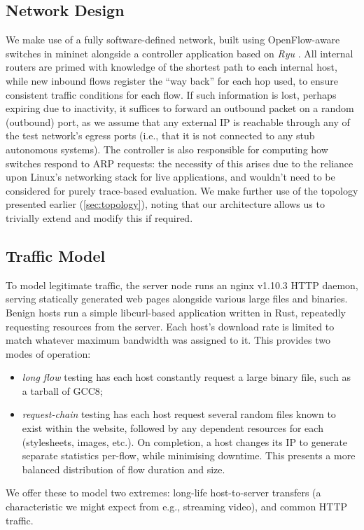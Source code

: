 \documentclass[conference, a4paper, 10pt, times]{IEEEtran}
\begin{document}
\subsection{Network Design}
We make use of a fully software-defined network, built using OpenFlow-aware switches in mininet alongside a controller application based on \emph{Ryu} \cite{ryu}.
All internal routers are primed with knowledge of the shortest path to each internal host, while new inbound flows register the ``way back'' for each hop used, to ensure consistent traffic conditions for each flow.
If such information is lost, perhaps expiring due to inactivity, it suffices to forward an outbound packet on a random (outbound) port, as we assume that any external IP is reachable through any of the test network's egress ports (i.e., that it is not connected to any stub autonomous systems).
The controller is also responsible for computing how switches respond to ARP requests: the necessity of this arises due to the reliance upon Linux's networking stack for live applications, and wouldn't need to be considered for purely trace-based evaluation.
We make further use of the topology presented earlier (\cref{sec:topology}), noting that our architecture allows us to trivially extend and modify this if required.

\subsection{Traffic Model}
To model legitimate traffic, the server node runs an nginx v1.10.3 HTTP daemon, serving statically generated web pages alongside various large files and binaries.
Benign hosts run a simple libcurl-based application written in Rust, repeatedly requesting resources from the server.
Each host's download rate is limited to match whatever maximum bandwidth was assigned to it.
This provides two modes of operation:
\begin{itemize}
	\item \emph{long flow} testing has each host constantly request a large binary file, such as a tarball of GCC8;
	\item \emph{request-chain} testing has each host request several random files known to exist within the website, followed by any dependent resources for each (stylesheets, images, etc.). On completion, a host changes its IP to generate separate statistics per-flow, while minimising downtime. This presents a more balanced distribution of flow duration and size.
\end{itemize}
We offer these to model two extremes: long-life host-to-server transfers (a characteristic we might expect from e.g., streaming video), and common HTTP traffic.
\end{document}
